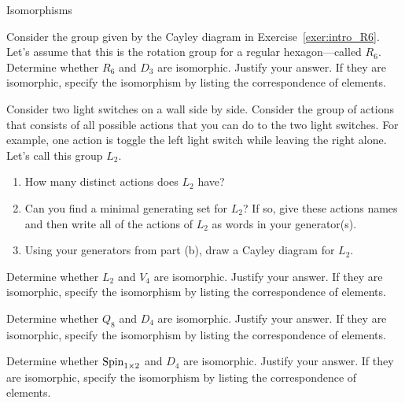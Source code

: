 \begin{section}{Isomorphisms}
\begin{problem}\label{prob:R6_not_iso_D3}
Consider the group given by the Cayley diagram in Exercise~\ref{exer:intro_R6}.  Let's assume that this is the rotation group for a regular hexagon---called $R_6$.  Determine whether $R_6$ and $D_3$ are isomorphic.  Justify your answer.  If they are isomorphic, specify the isomorphism by listing the correspondence of elements.
\end{problem}

\begin{exercise}
Consider two light switches on a wall side by side.  Consider the group of actions that consists of all possible actions that you can do to the two light switches.  For example, one action is toggle the left light switch while leaving the right alone.  Let's call this group $L_2$.
\begin{enumerate}[label=\rm{(\alph*)}]
\item How many distinct actions does $L_2$ have?
\item Can you find a minimal generating set for $L_2$?  If so, give these actions names and then write all of the actions of $L_2$ as words in your generator(s).
\item Using your generators from part (b), draw a Cayley diagram for $L_2$.
\end{enumerate}
\end{exercise}

\begin{problem}
Determine whether $L_2$ and $V_4$ are isomorphic.  Justify your answer.  If they are isomorphic, specify the isomorphism by listing the correspondence of elements.
\end{problem}

\begin{problem}
Determine whether $Q_8$ and $D_4$ are isomorphic.  Justify your answer.  If they are isomorphic, specify the isomorphism by listing the correspondence of elements.
\end{problem}

\begin{problem}
Determine whether $\operatorname{Spin}_{1\times 2}$ and $D_4$ are isomorphic.  Justify your answer.  If they are isomorphic, specify the isomorphism by listing the correspondence of elements.
\end{problem}


\end{section}
